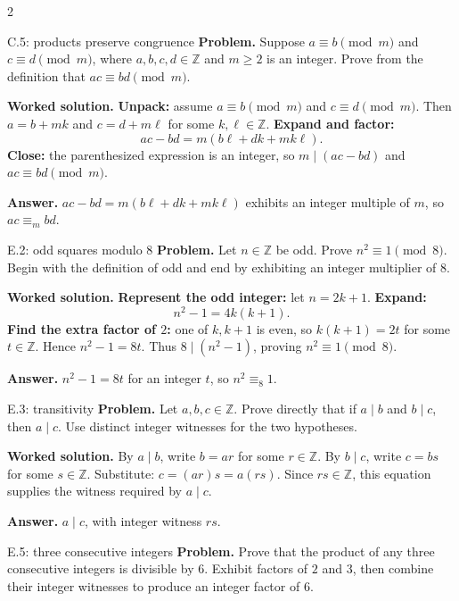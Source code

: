 \documentclass[10pt]{article}
\newcommand{\Z}{\mathbb Z}
\newcommand{\equivmod}[1]{\mathrel{\equiv_{#1}}}
\begin{document}
\begin{multicols}{2}
\begin{workedbox}{C.5: products preserve congruence}
\textbf{Problem.} Suppose $a\equiv b\pmod m$ and $c\equiv d\pmod m$, where $a,b,c,d\in\Z$ and $m\ge2$ is an integer. Prove from the definition that $ac\equiv bd\pmod m$.

\textbf{Worked solution.} \textbf{Unpack:} assume $a\equiv b\pmod m$ and $c\equiv d\pmod m$. Then
$a=b+mk$ and $c=d+m\ell$ for some $k,\ell\in\Z$. \textbf{Expand and factor:}
\[
ac-bd=m(b\ell+dk+mk\ell).
\]
\textbf{Close:} the parenthesized expression is an integer, so
$m\mid(ac-bd)$ and $ac\equiv bd\pmod m$.

\textbf{Answer.} $ac-bd=m(b\ell+dk+mk\ell)$ exhibits an integer multiple of $m$, so $ac\equivmod m bd$.
\end{workedbox}

\begin{workedbox}{E.2: odd squares modulo $8$}
\textbf{Problem.} Let $n\in\Z$ be odd. Prove $n^2\equiv1\pmod8$. Begin with the definition of odd and end by exhibiting an integer multiplier of $8$.

\textbf{Worked solution.} \textbf{Represent the odd integer:} let $n=2k+1$. \textbf{Expand:}
\[
n^2-1=4k(k+1).
\]
\textbf{Find the extra factor of $2$:} one of $k,k+1$ is even, so
$k(k+1)=2t$ for some $t\in\Z$. Hence $n^2-1=8t$. Thus
$8\mid(n^2-1)$, proving $n^2\equiv1\pmod8$.

\textbf{Answer.} $n^2-1=8t$ for an integer $t$, so $n^2\equivmod8 1$.
\end{workedbox}

\begin{workedbox}{E.3: transitivity}
\textbf{Problem.} Let $a,b,c\in\Z$. Prove directly that if $a\mid b$ and $b\mid c$, then $a\mid c$. Use distinct integer witnesses for the two hypotheses.

\textbf{Worked solution.} By $a\mid b$, write $b=ar$ for some $r\in\Z$. By $b\mid c$, write $c=bs$ for some $s\in\Z$. Substitute: $c=(ar)s=a(rs)$. Since $rs\in\Z$, this equation supplies the witness required by $a\mid c$.

\textbf{Answer.} $a\mid c$, with integer witness $rs$.
\end{workedbox}

\begin{workedbox}{E.5: three consecutive integers}
\textbf{Problem.} Prove that the product of any three consecutive integers is divisible by $6$. Exhibit factors of $2$ and $3$, then combine their integer witnesses to produce an integer factor of $6$.


\end{workedbox}
\end{multicols}
\end{document}
